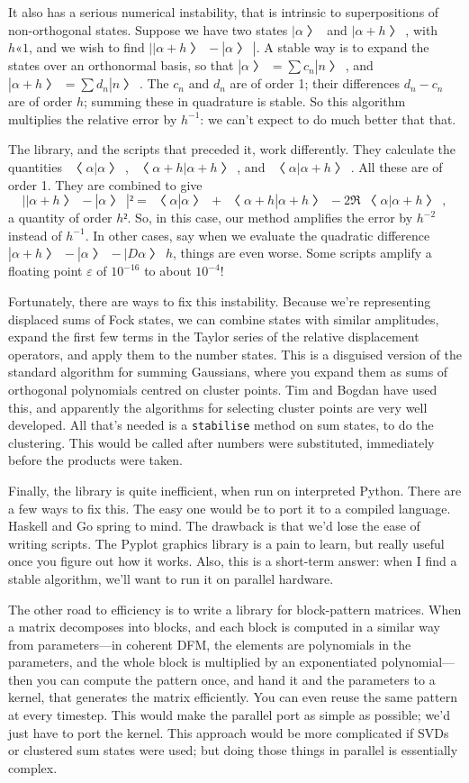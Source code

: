 It also has a serious numerical instability, that is intrinsic to superpositions of non-orthogonal states.  Suppose we have two states $|α〉$ and $|α+h〉$, with $h«1$, and we wish to find $||α+h〉-|α〉|$.  A stable way is to expand the states over an orthonormal basis, so that $|α〉=∑c_n|n〉$, and $|α+h〉=∑d_n|n〉$.  The $c_n$ and $d_n$ are of order 1; their differences $d_n-c_n$ are of order $h$; summing these in quadrature is stable.  So this algorithm multiplies the relative error by $h^{-1}$: we can't expect to do much better that that.

The library, and the scripts that preceded it, work differently.  They calculate the quantities $〈α|α〉$, $〈α+h|α+h〉$, and $〈α|α+h〉$.  All these are of order 1.  They are combined to give $$||α+h〉-|α〉|²=〈α|α〉+〈α+h|α+h〉-2\Re 〈α|α+h〉,$$ a quantity of order $h²$.  So, in this case, our method amplifies the error by $h^{-2}$ instead of $h^{-1}$.  In other cases, say when we evaluate the quadratic difference $|α+h〉-|α〉-|Dα〉h$, things are even worse.  Some scripts amplify a floating point $ε$ of $10^{-16}$ to about $10^{-4}$!

Fortunately, there are ways to fix this instability.  Because we're representing displaced sums of Fock states, we can combine states with similar amplitudes, expand the first few terms in the Taylor series of the relative displacement operators, and apply them to the number states.  This is a disguised version of the standard algorithm for summing Gaussians, where you expand them as sums of orthogonal polynomials centred on cluster points.  Tim and Bogdan have used this, and apparently the algorithms for selecting cluster points are very well developed.  All that's needed is a {\tt stabilise} method on sum states, to do the clustering.  This would be called after numbers were substituted, immediately before the products were taken.

Finally, the library is quite inefficient, when run on interpreted Python.  There are a few ways to fix this.  The easy one would be to port it to a compiled language.  Haskell and Go spring to mind.  The drawback is that we'd lose the ease of writing scripts.  The Pyplot graphics library is a pain to learn, but really useful once you figure out how it works.  Also, this is a short-term answer: when I find a stable algorithm, we'll want to run it on parallel hardware.

The other road to efficiency is to write a library for block-pattern matrices.  When a matrix decomposes into blocks, and each block is computed in a similar way from parameters—in coherent DFM, the elements are polynomials in the parameters, and the whole block is multiplied by an exponentiated polynomial—then you can compute the pattern once, and hand it and the parameters to a kernel, that generates the matrix efficiently.  You can even reuse the same pattern at every timestep.  This would make the parallel port as simple as possible; we'd just have to port the kernel.  This approach would be more complicated if SVDs or clustered sum states were used; but doing those things in parallel is essentially complex.


